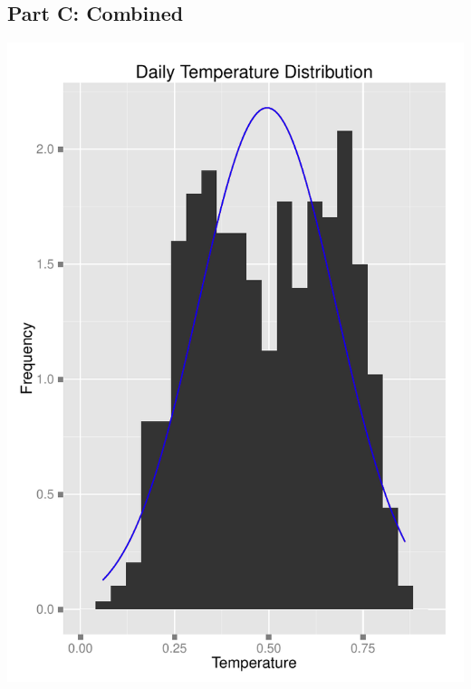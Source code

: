 \documentclass[11pt]{article}
\begin{document}
\subsection{Part C: Combined}
\label{subsesc:problem3ccombined}
\includegraphics{Problem3C.pdf}
\newline
\pagebreak

\end{document}
